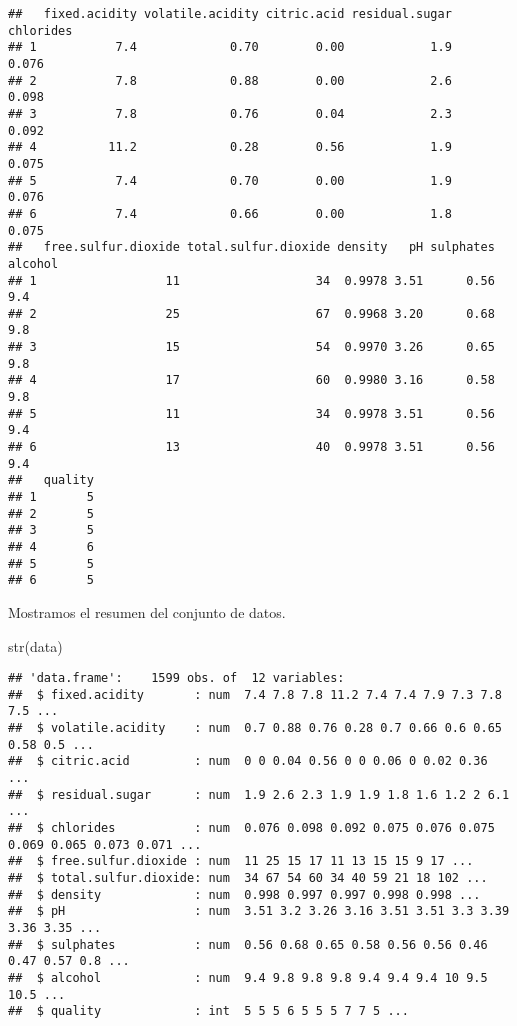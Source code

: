 \documentclass[
]{article}
\newenvironment{Shaded}{\begin{snugshade}}{\end{snugshade}}
\newcommand{\FunctionTok}[1]{\textcolor[rgb]{0.00,0.00,0.00}{#1}}
\newcommand{\NormalTok}[1]{#1}
\begin{document}
\begin{verbatim}
##   fixed.acidity volatile.acidity citric.acid residual.sugar chlorides
## 1           7.4             0.70        0.00            1.9     0.076
## 2           7.8             0.88        0.00            2.6     0.098
## 3           7.8             0.76        0.04            2.3     0.092
## 4          11.2             0.28        0.56            1.9     0.075
## 5           7.4             0.70        0.00            1.9     0.076
## 6           7.4             0.66        0.00            1.8     0.075
##   free.sulfur.dioxide total.sulfur.dioxide density   pH sulphates alcohol
## 1                  11                   34  0.9978 3.51      0.56     9.4
## 2                  25                   67  0.9968 3.20      0.68     9.8
## 3                  15                   54  0.9970 3.26      0.65     9.8
## 4                  17                   60  0.9980 3.16      0.58     9.8
## 5                  11                   34  0.9978 3.51      0.56     9.4
## 6                  13                   40  0.9978 3.51      0.56     9.4
##   quality
## 1       5
## 2       5
## 3       5
## 4       6
## 5       5
## 6       5
\end{verbatim}

Mostramos el resumen del conjunto de datos.

\begin{Shaded}
\begin{Highlighting}[]
\FunctionTok{str}\NormalTok{(data)}
\end{Highlighting}
\end{Shaded}

\begin{verbatim}
## 'data.frame':    1599 obs. of  12 variables:
##  $ fixed.acidity       : num  7.4 7.8 7.8 11.2 7.4 7.4 7.9 7.3 7.8 7.5 ...
##  $ volatile.acidity    : num  0.7 0.88 0.76 0.28 0.7 0.66 0.6 0.65 0.58 0.5 ...
##  $ citric.acid         : num  0 0 0.04 0.56 0 0 0.06 0 0.02 0.36 ...
##  $ residual.sugar      : num  1.9 2.6 2.3 1.9 1.9 1.8 1.6 1.2 2 6.1 ...
##  $ chlorides           : num  0.076 0.098 0.092 0.075 0.076 0.075 0.069 0.065 0.073 0.071 ...
##  $ free.sulfur.dioxide : num  11 25 15 17 11 13 15 15 9 17 ...
##  $ total.sulfur.dioxide: num  34 67 54 60 34 40 59 21 18 102 ...
##  $ density             : num  0.998 0.997 0.997 0.998 0.998 ...
##  $ pH                  : num  3.51 3.2 3.26 3.16 3.51 3.51 3.3 3.39 3.36 3.35 ...
##  $ sulphates           : num  0.56 0.68 0.65 0.58 0.56 0.56 0.46 0.47 0.57 0.8 ...
##  $ alcohol             : num  9.4 9.8 9.8 9.8 9.4 9.4 9.4 10 9.5 10.5 ...
##  $ quality             : int  5 5 5 6 5 5 5 7 7 5 ...
\end{verbatim}
\end{document}
